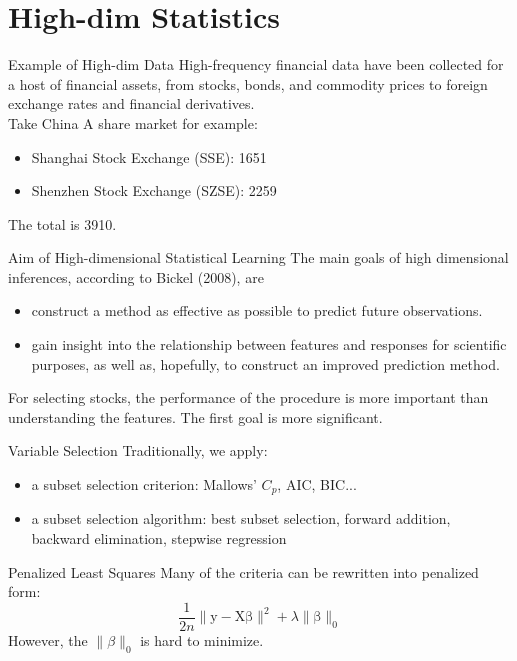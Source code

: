 \documentclass{beamer}
\begin{document}
\section{High-dim Statistics}

    \begin{frame}{Example of High-dim Data}
    High-frequency financial data have been collected for a host of financial assets, from stocks, bonds, and commodity prices to foreign exchange rates and financial derivatives. \\
    Take China A share market for example:
    \begin{itemize}
        \item Shanghai Stock Exchange (SSE): 1651
        \item Shenzhen Stock Exchange (SZSE): 2259
    \end{itemize}
    The total is 3910.
    \end{frame}

    \begin{frame}{Aim of High-dimensional Statistical Learning}
    The main goals of high dimensional inferences, according to Bickel (2008), are
    \begin{itemize}
        \item construct a method as effective as possible to predict future observations.
        \item gain insight into the relationship between features and responses for scientific purposes, as well as, hopefully, to construct an improved prediction method.
    \end{itemize}
    For selecting stocks, the performance of the procedure is more important than understanding the features. The first goal is more significant.
    \end{frame}
    
    \begin{frame}{Variable Selection}
    Traditionally, we apply:
    \begin{itemize}
        \item a subset selection criterion: Mallows' $C_p$, AIC, BIC...
        \item a subset selection algorithm: best subset selection, forward addition, backward elimination, stepwise regression
    \end{itemize}
    \end{frame}
    
    \begin{frame}{Penalized Least Squares}
    Many of the criteria can be rewritten into penalized form:
    \[
    \frac{1}{2n}\|\mathrm{y}-\mathrm{X}\mathrm{\beta}\|^2+ \lambda\|\mathrm{\beta}\|_0
    \]
    However, the $\|\beta\|_0$ is hard to minimize.
    \end{frame}
    
\end{document}
